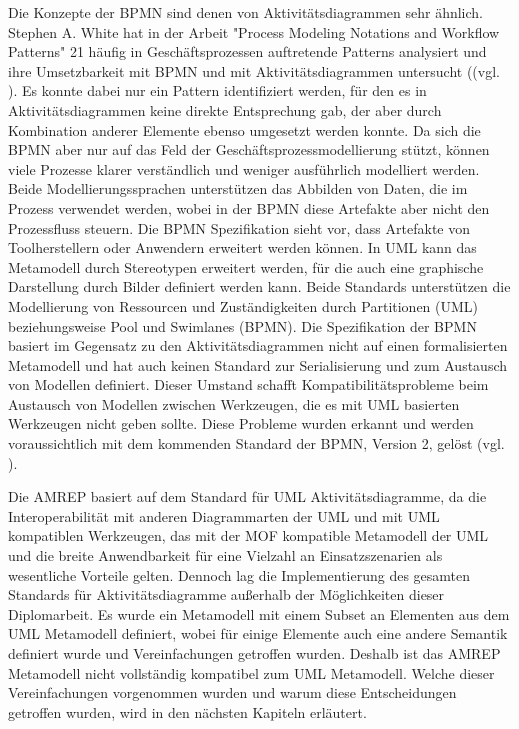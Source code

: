 Die Konzepte der BPMN sind denen von Aktivitätsdiagrammen sehr ähnlich. Stephen A. White hat in der Arbeit "Process Modeling Notations and Workflow Patterns" 21 häufig in Geschäftsprozessen auftretende Patterns analysiert und ihre Umsetzbarkeit mit BPMN und mit Aktivitätsdiagrammen untersucht ((vgl. \citep{White20042}). Es konnte dabei nur ein Pattern identifiziert werden, für den es in Aktivitätsdiagrammen keine direkte Entsprechung gab, der aber durch Kombination anderer Elemente ebenso umgesetzt werden konnte. Da sich die BPMN aber nur auf das Feld der Geschäftsprozessmodellierung stützt, können viele Prozesse klarer verständlich und weniger ausführlich modelliert werden.
Beide Modellierungssprachen unterstützen das Abbilden von Daten, die im Prozess verwendet werden, wobei in der BPMN diese Artefakte aber nicht den Prozessfluss steuern. Die BPMN Spezifikation sieht vor, dass Artefakte von Toolherstellern oder Anwendern erweitert werden können. In UML kann das Metamodell durch Stereotypen erweitert werden, für die auch eine graphische Darstellung durch Bilder definiert werden kann. Beide Standards unterstützen die Modellierung von Ressourcen und Zuständigkeiten durch Partitionen (UML) beziehungsweise Pool und Swimlanes (BPMN).
Die Spezifikation der BPMN basiert im Gegensatz zu den Aktivitätsdiagrammen nicht auf einen formalisierten Metamodell und hat auch keinen Standard zur Serialisierung und zum Austausch von Modellen definiert. Dieser Umstand schafft Kompatibilitätsprobleme beim Austausch von Modellen zwischen Werkzeugen, die es mit UML basierten Werkzeugen nicht geben sollte.
Diese Probleme wurden erkannt und werden voraussichtlich mit dem kommenden Standard der BPMN, Version 2, gelöst (vgl. \citep{BPMN2007}).

Die AMREP basiert auf dem Standard für UML Aktivitätsdiagramme, da die Interoperabilität mit anderen Diagrammarten der UML und mit UML kompatiblen Werkzeugen, das mit der MOF kompatible Metamodell der UML und die breite Anwendbarkeit für eine Vielzahl an Einsatzszenarien als wesentliche Vorteile gelten. Dennoch lag die Implementierung des gesamten Standards für Aktivitätsdiagramme außerhalb der Möglichkeiten dieser Diplomarbeit. Es wurde ein Metamodell mit einem Subset an Elementen aus dem UML Metamodell definiert, wobei für einige Elemente auch eine andere Semantik definiert wurde und Vereinfachungen getroffen wurden. Deshalb ist das AMREP Metamodell nicht vollständig kompatibel zum UML Metamodell. Welche dieser Vereinfachungen vorgenommen wurden und warum diese Entscheidungen getroffen wurden, wird in den nächsten Kapiteln erläutert.

